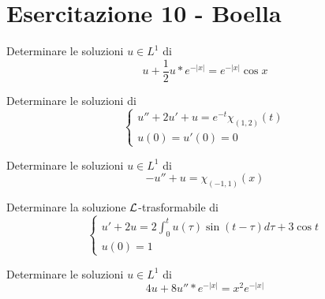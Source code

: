 \chapter{Esercitazione 10 - Boella}
\ParteEsercizi
\Esercizio{}

Determinare le soluzioni $u\in L^{1}$ di
\begin{equation*}
u+\frac{1}{2} u*e^{-| x| } =e^{-| x| }\cos x
\end{equation*}
\Esercizio{}

Determinare le soluzioni di
\begin{equation*}
\begin{cases}
u''+2u'+u=e^{-t} \chi _{( 1,2)}( t)\\
u( 0) =u'( 0) =0
\end{cases}
\end{equation*}
\Esercizio{}

Determinare le soluzioni $u\in L^{1}$ di
\begin{equation*}
-u''+u=\chi _{( -1,1)}( x)
\end{equation*}
\Esercizio{}

Determinare la soluzione $\mathcal{L}$-trasformabile di
\begin{equation*}
\begin{cases}
u'+2u=2\int ^{t}_{0} u( \tau )\sin( t-\tau ) d\tau +3\cos t\\
u( 0) =1
\end{cases}
\end{equation*}
\Esercizio{}

Determinare le soluzioni $u\in L^{1}$ di
\begin{equation*}
4u+8u''*e^{-| x| } =x^{2} e^{-| x| }
\end{equation*}
\Esercizio{}

